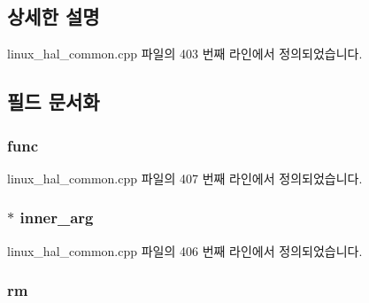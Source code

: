 \subsection{상세한 설명}


linux\+\_\+hal\+\_\+common.\+cpp 파일의 403 번째 라인에서 정의되었습니다.



\subsection{필드 문서화}
\subsubsection[{\texorpdfstring{func}{func}}]{ func}\hypertarget{struct_linux_timer_queue_action_arg_aaa1ebdc5351c8e4b6cd0b92aabfa4d52}{}\label{struct_linux_timer_queue_action_arg_aaa1ebdc5351c8e4b6cd0b92aabfa4d52}


linux\+\_\+hal\+\_\+common.\+cpp 파일의 407 번째 라인에서 정의되었습니다.

\subsubsection[{\texorpdfstring{inner\+\_\+arg}{inner_arg}}]{$\ast$ inner\+\_\+arg}\hypertarget{struct_linux_timer_queue_action_arg_afc701b8a5b43cd1d29422c68856bc614}{}\label{struct_linux_timer_queue_action_arg_afc701b8a5b43cd1d29422c68856bc614}


linux\+\_\+hal\+\_\+common.\+cpp 파일의 406 번째 라인에서 정의되었습니다.

\subsubsection[{\texorpdfstring{rm}{rm}}]{ rm}\hypertarget{struct_linux_timer_queue_action_arg_a059a8adfbb578bc50c97a96ae2ac0779}{}\label{struct_linux_timer_queue_action_arg_a059a8adfbb578bc50c97a96ae2ac0779}


